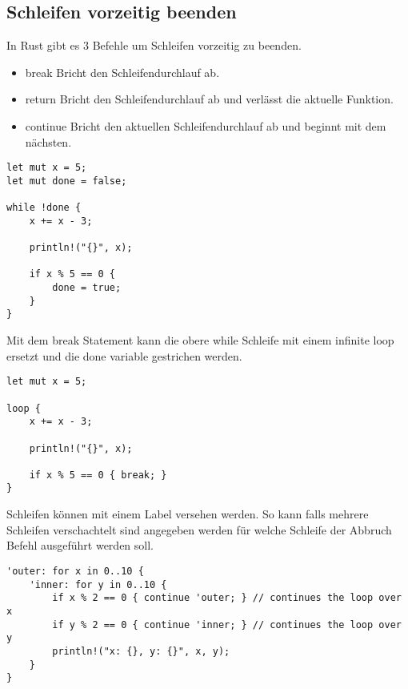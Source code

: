 \subsection{Schleifen vorzeitig beenden}
In Rust gibt es 3 Befehle um Schleifen vorzeitig zu beenden.
\begin{itemize}
\item break
\subitem Bricht den Schleifendurchlauf ab.
\item return
\subitem Bricht den Schleifendurchlauf ab und verlässt die aktuelle Funktion.
\item continue
\subitem Bricht den aktuellen Schleifendurchlauf ab und beginnt mit dem nächsten.
\end{itemize}

\begin{lstlisting}
let mut x = 5;
let mut done = false;

while !done {
	x += x - 3;

	println!("{}", x);

	if x % 5 == 0 {
		done = true;
	}
}
\end{lstlisting}

Mit dem break Statement kann die obere while Schleife mit einem infinite loop ersetzt und die done variable gestrichen werden.

\begin{lstlisting}
let mut x = 5;

loop {
	x += x - 3;

	println!("{}", x);

	if x % 5 == 0 { break; }
}
\end{lstlisting}

Schleifen können mit einem Label versehen werden.
So kann falls mehrere Schleifen verschachtelt sind angegeben werden für welche Schleife der Abbruch Befehl ausgeführt werden soll.

\begin{lstlisting}
'outer: for x in 0..10 {
	'inner: for y in 0..10 {
		if x % 2 == 0 { continue 'outer; } // continues the loop over x
		if y % 2 == 0 { continue 'inner; } // continues the loop over y
		println!("x: {}, y: {}", x, y);
	}
}
\end{lstlisting}
